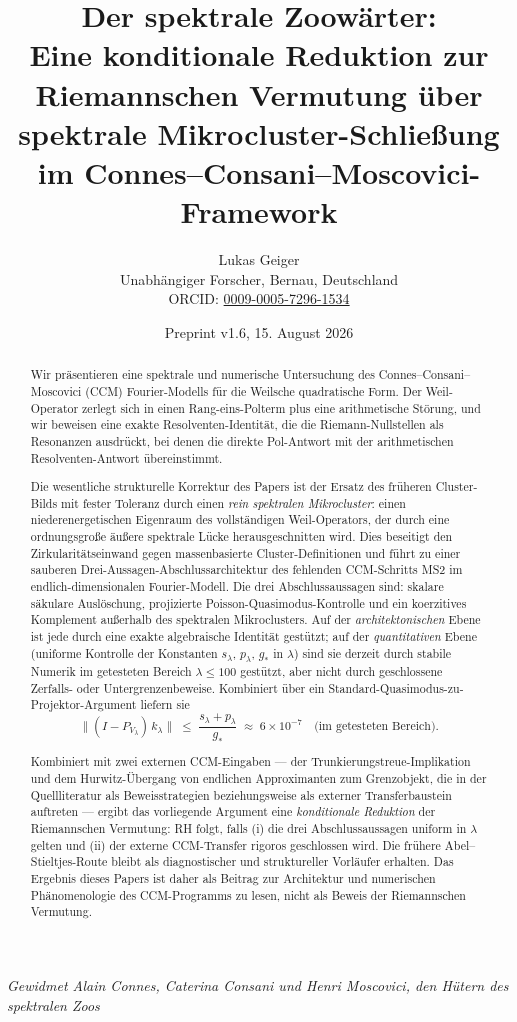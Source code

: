 \documentclass[12pt,a4paper]{article}
\title{Der spektrale Zoowärter:\\[4pt]
{\large Eine konditionale Reduktion zur Riemannschen Vermutung über spektrale Mikrocluster-Schließung}\\[2pt]
{\large im Connes--Consani--Moscovici-Framework}}
\author{Lukas Geiger\\
\small Unabhängiger Forscher, Bernau, Deutschland\\
\small ORCID: \href{https://orcid.org/0009-0005-7296-1534}{0009-0005-7296-1534}}
\date{Preprint v1.6, 15. August 2026}
\theoremstyle{definition}
\theoremstyle{remark}
\begin{document}
\overfullrule=0pt
\maketitle

\begin{center}
\textit{Gewidmet Alain Connes, Caterina Consani und Henri Moscovici, den Hütern des spektralen Zoos}
\end{center}

\begin{abstract}
Wir präsentieren eine spektrale und numerische Untersuchung des
Connes--Consani--Moscovici (CCM) Fourier-Modells für die Weilsche quadratische
Form. Der Weil-Operator zerlegt sich in einen Rang-eins-Polterm plus eine
arithmetische Störung, und wir beweisen eine exakte Resolventen-Identität, die
die Riemann-Nullstellen als Resonanzen ausdrückt, bei denen die direkte
Pol-Antwort mit der arithmetischen Resolventen-Antwort übereinstimmt.

Die wesentliche strukturelle Korrektur des Papers ist der Ersatz des
früheren Cluster-Bilds mit fester Toleranz durch einen \emph{rein spektralen
Mikrocluster}: einen niederenergetischen Eigenraum des vollständigen
Weil-Operators, der durch eine ordnungsgroße äußere spektrale Lücke
herausgeschnitten wird. Dies beseitigt den Zirkularitätseinwand gegen
massenbasierte Cluster-Definitionen und führt zu einer sauberen
Drei-Aussagen-Abschlussarchitektur des fehlenden CCM-Schritts MS2 im
endlich-dimensionalen Fourier-Modell. Die drei Abschlussaussagen sind:
skalare säkulare Auslöschung, projizierte Poisson-Quasimodus-Kontrolle
und ein koerzitives Komplement außerhalb des spektralen Mikroclusters.
Auf der \emph{architektonischen} Ebene ist jede durch eine exakte
algebraische Identität gestützt; auf der \emph{quantitativen} Ebene
(uniforme Kontrolle der Konstanten $s_\lambda$, $p_\lambda$, $g_*$ in
$\lambda$) sind sie derzeit durch stabile Numerik im getesteten Bereich
$\lambda \le 100$ gestützt, aber nicht durch geschlossene Zerfalls- oder
Untergrenzenbeweise. Kombiniert über ein Standard-Quasimodus-zu-Projektor-Argument
liefern sie
\[
  \|(I - P_{V_\lambda})\, k_\lambda\|
  \;\leq\; \frac{s_\lambda + p_\lambda}{g_*}
  \;\approx\; 6 \times 10^{-7}
  \quad\text{(im getesteten Bereich)}.
\]

Kombiniert mit zwei externen CCM-Eingaben --- der
Trunkierungstreue-Implikation und dem Hurwitz-Übergang von endlichen
Approximanten zum Grenzobjekt, die in der Quellliteratur als
Beweisstrategien beziehungsweise als externer Transferbaustein auftreten ---
ergibt das vorliegende Argument eine \emph{konditionale Reduktion} der
Riemannschen Vermutung: RH folgt, falls (i) die drei Abschlussaussagen
uniform in $\lambda$ gelten und (ii) der externe CCM-Transfer rigoros
geschlossen wird. Die frühere Abel--Stieltjes-Route bleibt als diagnostischer
und struktureller Vorläufer erhalten. Das Ergebnis dieses Papers ist daher
als Beitrag zur Architektur und numerischen Phänomenologie des CCM-Programms
zu lesen, nicht als Beweis der Riemannschen Vermutung.
\end{abstract}
\end{document}
